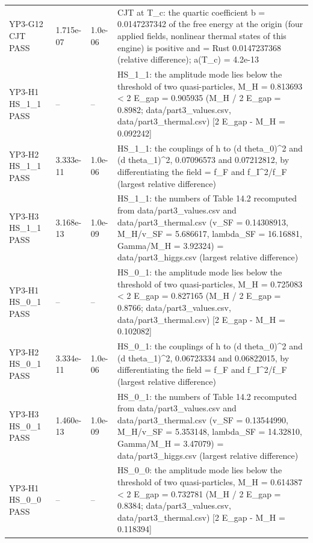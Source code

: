 \documentclass[aps,prd,onecolumn,superscriptaddress,nofootinbib,floatfix,longbibliography]{revtex4-2}
\begin{document}
\begin{longtable}{p{}p{}p{}p{}}
YP3-G12 CJT \newline PASS & 1.715e-07 & 1.0e-06 & CJT at T\_c: the quartic coefficient b = 0.0147237342 of the free energy at the origin (four applied fields, nonlinear thermal states of this engine) is positive and = Rust 0.0147237368 (relative difference); a(T\_c) = 4.2e-13 \\
YP3-H1 HS\_1\_1 \newline PASS & -- & -- & HS\_1\_1: the amplitude mode lies below the threshold of two quasi-particles, M\_H = 0.813693 \textless{} 2 E\_gap = 0.905935 (M\_H / 2 E\_gap = 0.8982; data/part3\_values.csv, data/part3\_thermal.csv) [2 E\_gap - M\_H = 0.092242] \\
YP3-H2 HS\_1\_1 \newline PASS & 3.333e-11 & 1.0e-06 & HS\_1\_1: the couplings of h to (d theta\_0)\textasciicircum{}2 and (d theta\_1)\textasciicircum{}2, 0.07096573 and 0.07212812, by differentiating the field = f\_F and f\_I\textasciicircum{}2/f\_F (largest relative difference) \\
YP3-H3 HS\_1\_1 \newline PASS & 3.168e-13 & 1.0e-09 & HS\_1\_1: the numbers of Table 14.2 recomputed from data/part3\_values.csv and data/part3\_thermal.csv (v\_SF = 0.14308913, M\_H/v\_SF = 5.686617, lambda\_SF = 16.16881, Gamma/M\_H = 3.92324) = data/part3\_higgs.csv (largest relative difference) \\
YP3-H1 HS\_0\_1 \newline PASS & -- & -- & HS\_0\_1: the amplitude mode lies below the threshold of two quasi-particles, M\_H = 0.725083 \textless{} 2 E\_gap = 0.827165 (M\_H / 2 E\_gap = 0.8766; data/part3\_values.csv, data/part3\_thermal.csv) [2 E\_gap - M\_H = 0.102082] \\
YP3-H2 HS\_0\_1 \newline PASS & 3.334e-11 & 1.0e-06 & HS\_0\_1: the couplings of h to (d theta\_0)\textasciicircum{}2 and (d theta\_1)\textasciicircum{}2, 0.06723334 and 0.06822015, by differentiating the field = f\_F and f\_I\textasciicircum{}2/f\_F (largest relative difference) \\
YP3-H3 HS\_0\_1 \newline PASS & 1.460e-13 & 1.0e-09 & HS\_0\_1: the numbers of Table 14.2 recomputed from data/part3\_values.csv and data/part3\_thermal.csv (v\_SF = 0.13544990, M\_H/v\_SF = 5.353148, lambda\_SF = 14.32810, Gamma/M\_H = 3.47079) = data/part3\_higgs.csv (largest relative difference) \\
YP3-H1 HS\_0\_0 \newline PASS & -- & -- & HS\_0\_0: the amplitude mode lies below the threshold of two quasi-particles, M\_H = 0.614387 \textless{} 2 E\_gap = 0.732781 (M\_H / 2 E\_gap = 0.8384; data/part3\_values.csv, data/part3\_thermal.csv) [2 E\_gap - M\_H = 0.118394] \\

\end{longtable}
\end{document}
